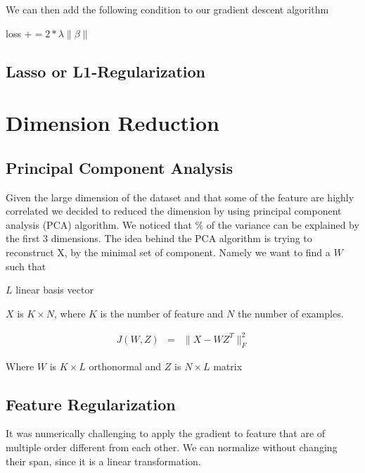 \documentclass[conference]{IEEEtran}
\begin{document}
We can then add the following condition to our gradient descent algorithm

\begin{algorithmic}
\State loss $+= 2 * \lambda \| \beta \|$
\EndIf
\end{algorithmic}

\subsection{Lasso or L1-Regularization}

\cite{scikit-learn}
\cite{hastie2005elements}

\section{Dimension Reduction}

\subsection{Principal Component Analysis}

Given the large dimension of the dataset and that some of the feature are highly
correlated we decided to reduced the dimension by using 
principal component analysis (PCA) algorithm. We noticed that $\%$ of the
variance can be explained by the first $3$ dimensions. The idea behind the PCA
algorithm is trying to reconstruct X, by the minimal set of component. Namely we
want to find a $W$ such that 

$L$ linear basis vector

$X$ is $K \times N$, where $K$ is the number of feature and $N$ the number of
examples. 

\begin{eqnarray}
  J(W, Z) &=& \| X - WZ^T\|_F^2
\end{eqnarray}

Where $W$ is $K \times L$ orthonormal and $Z$ is $N \times L$ matrix

\cite{murphy2012machine}
\cite{scikit-learn}

\subsection{Feature Regularization}

It was numerically challenging to apply the gradient to feature that are of
multiple order different from each other. We can normalize without changing
their span, since it is a linear transformation.
\end{document}
